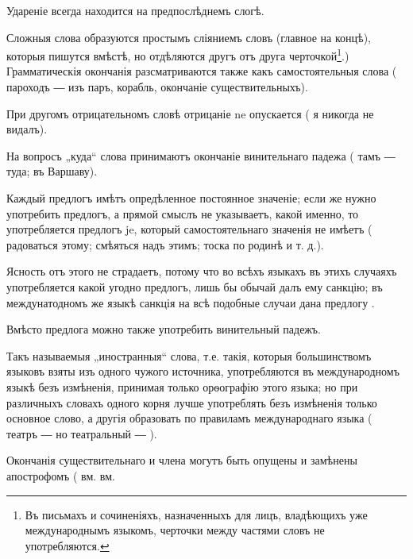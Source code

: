      Удареніе всегда находится на предпослѣднемъ слогѣ.
    
     Сложныя слова образуются простымъ сліяниемъ словъ (главное на концѣ), которыя пишутся вмѣстѣ, но отдѣляются другъ отъ друга черточкой\footnote{Въ письмахъ и сочиненіяхъ, назначенныхъ для лицъ, владѣющихъ уже международнымъ языкомъ, черточки между частями словъ не употребляются.}.) Грамматическія окончанія разсматриваются также какъ самостоятельныя слова (  пароходъ ― изъ  паръ,  корабль,  окончаніе существительныхъ).
    
     При другомъ отрицательномъ словѣ отрицаніе ne опускается (  я никогда не видалъ).
    
     На вопросъ „куда“ слова принимаютъ окончаніе винительнаго падежа (  тамъ ―  туда;  въ Варшаву).
    
     Каждый предлогъ имѣтъ опредѣленное постоянное значеніе; если же нужно употребить предлогъ, а прямой смыслъ не указываетъ, какой именно, то употребляется предлогъ je, который самостоятельнаго значенія не имѣетъ (  радоваться этому;  смѣяться надъ этимъ;  тоска по родинѣ и т. д.).
    
    Ясность отъ этого не страдаетъ, потому что во всѣхъ языкахъ въ этихъ случаяхъ употребляется какой угодно предлогъ, лишь бы обычай далъ ему санкцію; въ междунатодномъ же языкѣ санкція на всѣ подобные случаи дана  предлогу .
    
    Вмѣсто предлога  можно также употребить винительный падежъ.
    
     Такъ называемыя „иностранныя“ слова, т.е. такія, которыя большинствомъ языковъ взяты изъ одного чужого источника, употребляются въ международномъ языкѣ безъ измѣненія, принимая только орѳографію этого языка; но при различныхъ словахъ одного корня лучше употреблять безъ измѣненія только основное слово, а другія образовать по правиламъ международнаго языка ( театръ ―  но театральный ― ).
    
     Окончанія существительнаго и члена могутъ быть опущены и замѣнены апострофомъ (  вм.  вм. 
    
\newpage
